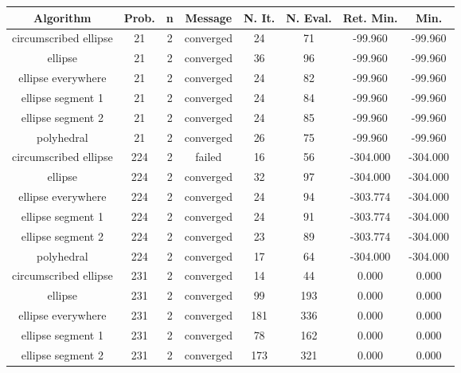 \begin{footnotesize}
\begin{center}
\begin{longtable}{ c c c c c c c c }
Algorithm & Prob. & n & Message & N. It. & N. Eval. & Ret. Min. & Min. \\
\hline
\endhead
  circumscribed ellipse   &   21  &  2  & converged  &   24  &   71  &  -99.960   &  -99.960   \\
         ellipse          &   21  &  2  & converged  &   36  &   96  &  -99.960   &  -99.960   \\
    ellipse everywhere    &   21  &  2  & converged  &   24  &   82  &  -99.960   &  -99.960   \\
    ellipse segment 1     &   21  &  2  & converged  &   24  &   84  &  -99.960   &  -99.960   \\
    ellipse segment 2     &   21  &  2  & converged  &   24  &   85  &  -99.960   &  -99.960   \\
        polyhedral        &   21  &  2  & converged  &   26  &   75  &  -99.960   &  -99.960   \\
  circumscribed ellipse   &  224  &  2  &   failed   &   16  &   56  &  -304.000  &  -304.000  \\
         ellipse          &  224  &  2  & converged  &   32  &   97  &  -304.000  &  -304.000  \\
    ellipse everywhere    &  224  &  2  & converged  &   24  &   94  &  -303.774  &  -304.000  \\
    ellipse segment 1     &  224  &  2  & converged  &   24  &   91  &  -303.774  &  -304.000  \\
    ellipse segment 2     &  224  &  2  & converged  &   23  &   89  &  -303.774  &  -304.000  \\
        polyhedral        &  224  &  2  & converged  &   17  &   64  &  -304.000  &  -304.000  \\
  circumscribed ellipse   &  231  &  2  & converged  &   14  &   44  &   0.000    &   0.000    \\
         ellipse          &  231  &  2  & converged  &   99  &  193  &   0.000    &   0.000    \\
    ellipse everywhere    &  231  &  2  & converged  &  181  &  336  &   0.000    &   0.000    \\
    ellipse segment 1     &  231  &  2  & converged  &   78  &  162  &   0.000    &   0.000    \\
    ellipse segment 2     &  231  &  2  & converged  &  173  &  321  &   0.000    &   0.000    \\

\end{longtable}
\end{center}
\end{footnotesize}
